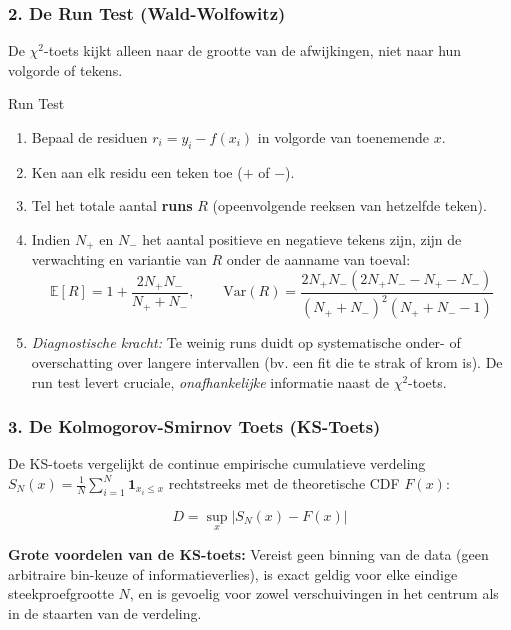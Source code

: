\documentclass[11pt,a4paper]{article}
\newcommand{\E}{\mathbb{E}}
\newcommand{\Var}{\text{Var}}
\begin{document}
\subsubsection{2. De Run Test (Wald-Wolfowitz)}
De $\chi^2$-toets kijkt alleen naar de grootte van de afwijkingen, niet naar hun volgorde of tekens.
\begin{stappenplan}{Run Test}
\begin{enumerate}[leftmargin=1.2em]
    \item Bepaal de residuen $r_i = y_i - f(x_i)$ in volgorde van toenemende $x$.
    \item Ken aan elk residu een teken toe ($+$ of $-$).
    \item Tel het totale aantal \textbf{runs} $R$ (opeenvolgende reeksen van hetzelfde teken).
    \item Indien $N_+$ en $N_-$ het aantal positieve en negatieve tekens zijn, zijn de verwachting en variantie van $R$ onder de aanname van toeval:
    \begin{equation}
        \E[R] = 1 + \frac{2 N_+ N_-}{N_+ + N_-}, \qquad \Var(R) = \frac{2 N_+ N_- (2 N_+ N_- - N_+ - N_-)}{(N_+ + N_-)^2 (N_+ + N_- - 1)}
    \end{equation}
    \item \emph{Diagnostische kracht:} Te weinig runs duidt op systematische onder- of overschatting over langere intervallen (bv. een fit die te strak of krom is). De run test levert cruciale, \emph{onafhankelijke} informatie naast de $\chi^2$-toets.
\end{enumerate}
\end{stappenplan}

\subsubsection{3. De Kolmogorov-Smirnov Toets (KS-Toets)}
De KS-toets vergelijkt de continue empirische cumulatieve verdeling $S_N(x) = \frac{1}{N}\sum_{i=1}^N \mathbf{1}_{x_i \le x}$ rechtstreeks met de theoretische CDF $F(x)$:
\begin{formulabox}
\begin{equation}
    D = \sup_{x} |S_N(x) - F(x)|
\end{equation}
\end{formulabox}
\textbf{Grote voordelen van de KS-toets:} Vereist geen binning van de data (geen arbitraire bin-keuze of informatieverlies), is exact geldig voor elke eindige steekproefgrootte $N$, en is gevoelig voor zowel verschuivingen in het centrum als in de staarten van de verdeling.
\end{document}
